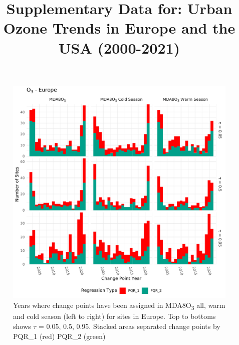 \documentclass{article}
\title{Supplementary Data for: Urban Ozone Trends in Europe and the USA (2000-2021)}
\date{}
\begin{document}
\maketitle
\clearpage



\begin{figure}[p]
\centering
\includegraphics[width=\linewidth]{figures/si_figures/fS01_cp_year_o3_Europe.pdf}
\caption{Years where change points have been assigned in MDA8O\textsubscript{3} all, warm and cold season (left to right) for sites in Europe. Top to bottoms shows $\tau$ = 0.05, 0.5, 0.95. Stacked areas separated change points by PQR\_1 (red) PQR\_2 (green)}
\label{si_fig:cp_year_eu}
\end{figure}
\clearpage
\end{document}
